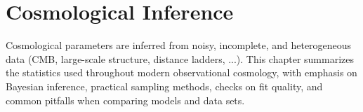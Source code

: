 






\chapter{Cosmological Inference}
\label{ch:cosmological_inference}

Cosmological parameters are inferred from noisy, incomplete, and heterogeneous data (CMB, large-scale structure, distance ladders, ...). This chapter summarizes the statistics used throughout modern observational cosmology, with emphasis on Bayesian inference, practical sampling methods, checks on fit quality, and common pitfalls when comparing models and data sets.

